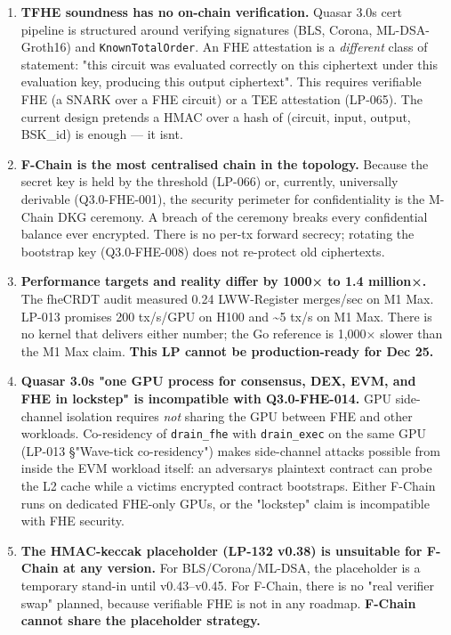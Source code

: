 \documentclass[
]{article}
\begin{document}
\begin{enumerate}
\def\labelenumi{\arabic{enumi}.}
\item
  \textbf{TFHE soundness has no on-chain verification.} Quasar
  3.0\textquotesingle s cert pipeline is structured around verifying
  signatures (BLS, Corona, ML-DSA-Groth16) and
  \texttt{KnownTotalOrder}. An FHE attestation is a \emph{different}
  class of statement: "this circuit was evaluated correctly on this
  ciphertext under this evaluation key, producing this output
  ciphertext". This requires verifiable FHE (a SNARK over a FHE circuit)
  or a TEE attestation (LP-065). The current design pretends a HMAC over
  a hash of (circuit, input, output, BSK\_id) is enough --- it
  isn\textquotesingle t.
\item
  \textbf{F-Chain is the most centralised chain in the topology.}
  Because the secret key is held by the threshold (LP-066) or,
  currently, universally derivable (Q3.0-FHE-001), the security
  perimeter for confidentiality is the M-Chain DKG ceremony. A breach of
  the ceremony breaks every confidential balance ever encrypted. There
  is no per-tx forward secrecy; rotating the bootstrap key
  (Q3.0-FHE-008) does not re-protect old ciphertexts.
\item
  \textbf{Performance targets and reality differ by 1000× to 1.4
  million×.} The fheCRDT audit measured 0.24 LWW-Register merges/sec on
  M1 Max. LP-013 promises 200 tx/s/GPU on H100 and \textasciitilde5 tx/s
  on M1 Max. There is no kernel that delivers either number; the Go
  reference is 1,000× slower than the M1 Max claim. \textbf{This LP
  cannot be production-ready for Dec 25.}
\item
  \textbf{Quasar 3.0\textquotesingle s "one GPU process for consensus,
  DEX, EVM, and FHE in lockstep" is incompatible with Q3.0-FHE-014.} GPU
  side-channel isolation requires \emph{not} sharing the GPU between FHE
  and other workloads. Co-residency of \texttt{drain\_fhe} with
  \texttt{drain\_exec} on the same GPU (LP-013 §"Wave-tick
  co-residency") makes side-channel attacks possible from inside the EVM
  workload itself: an adversary\textquotesingle s plaintext contract can
  probe the L2 cache while a victim\textquotesingle s encrypted contract
  bootstraps. Either F-Chain runs on dedicated FHE-only GPUs, or the
  "lockstep" claim is incompatible with FHE security.
\item
  \textbf{The HMAC-keccak placeholder (LP-132 v0.38) is unsuitable for
  F-Chain at any version.} For BLS/Corona/ML-DSA, the placeholder is a
  temporary stand-in until v0.43--v0.45. For F-Chain, there is no "real
  verifier swap" planned, because verifiable FHE is not in any roadmap.
  \textbf{F-Chain cannot share the placeholder strategy.}
\end{enumerate}
\end{document}
